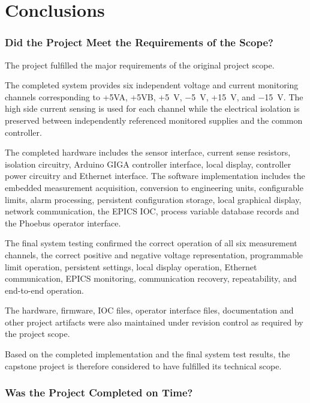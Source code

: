 
\chapter{Conclusions}
\label{chap:conclusions}
\subsection{Did the Project Meet the Requirements of the Scope?}

The project fulfilled the major requirements of the original project scope.

The completed system provides six independent voltage and current monitoring channels corresponding to +5VA, +5VB, +5~V, $-$5~V, +15~V, and $-$15~V. The high side current sensing is used for each channel while the electrical isolation is preserved between independently referenced monitored supplies and the common controller.

The completed hardware includes the sensor interface, current sense resistors, isolation circuitry, Arduino GIGA controller interface, local display, controller power circuitry and Ethernet interface. The software implementation includes the embedded measurement acquisition, conversion to engineering units, configurable limits, alarm processing, persistent configuration storage, local graphical display, network communication, the EPICS IOC, process variable database records and the Phoebus operator interface.

The final system testing confirmed the correct operation of all six measurement channels, the correct positive and negative voltage representation, programmable limit operation, persistent settings, local display operation, Ethernet communication, EPICS monitoring, communication recovery, repeatability, and end-to-end operation.

The hardware, firmware, IOC files, operator interface files, documentation and other project artifacts were also maintained under revision control as required by the project scope.

Based on the completed implementation and the final system test results, the capstone project is therefore considered to have fulfilled its technical scope.

\subsection{Was the Project Completed on Time?}

